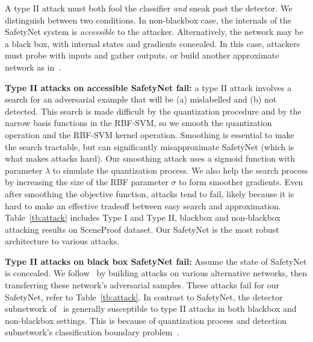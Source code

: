 \documentclass[10pt,twocolumn,letterpaper]{article}
\begin{document}
A type II attack  must both fool the classifier {\em and} sneak past the detector.  We distinguish between 
two conditions. In non-blackbox case, the internals of the SafetyNet system is {\em accessible} to the attacker.  Alternatively, the
network may be a black box, with internal states and gradients concealed. In this case, attackers must probe with
inputs and gather outputs, or build another approximate network as in~\cite{papernot2016practical}. 


{\bf Type II attacks on accessible SafetyNet fail:} a type II attack involves a 
 search for an adversarial example that will be (a)
mislabelled and (b) not detected.  This search is made difficult by the quantization procedure and by the narrow basis
functions in the RBF-SVM, so we smooth the quantization operation and the  RBF-SVM kernel operation.
Smoothing is essential to make the search tractable, but can significantly misapproximate SafetyNet (which is what makes
attacks hard).    Our smoothing attack uses a sigmoid function with 
parameter $\lambda$ to simulate the quantization process.  We also help the search process by increasing the size of the RBF parameter $\sigma$ to
form smoother gradients.  Even after smoothing the objective function, attacks tend to fail, likely because it is hard to make an effective tradeoff between easy
search and approximation. Table~\ref{tb:attack} includes Type I and Type II, blackbox and non-blackbox attacking results on SceneProof dataset. Our SafetyNet
is the most robust architecture to various attacks. 

\textbf{Type II attacks on black box SafetyNet fail:} Assume the state of SafetyNet is concealed.  We follow~\cite{papernot2016transferability,
  moosavi2016universal} by building attacks on various alternative networks, then transferring these network's adversarial samples. These attacks fail for
our SafetyNet, refer to Table~\ref{tb:attack}. In contrast to SafetyNet, the detector subnetwork of~\cite{metzen2017detecting} is generally susceptible 
to type II attacks in both blackbox and non-blackbox settings. This is because of quantization process and detection subnetwork's classification boundary 
problem~\cite{moosavi2016universal}.
\end{document}
